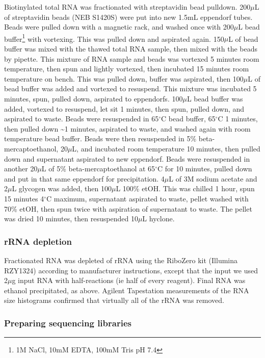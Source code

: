 Biotinylated total RNA was fractionated with streptavidin bead pulldown.
200\(\mu\)L of streptavidin beads (NEB S1420S) were put into new 1.5mL
eppendorf tubes. Beads were pulled down with a magnetic rack, and washed
once with 200\(\mu\)L bead buffer\footnote{1M NaCl, 10mM EDTA, 100mM
  Tris pH 7.4} with vortexing. This was pulled down and aspirated again.
150\(\mu\)L of bead buffer was mixed with the thawed total RNA sample,
then mixed with the beads by pipette. This mixture of RNA sample and
beads was vortexed 5 minutes room temperature, then spun and lightly
vortexed, then incubated 15 minutes room temperature on bench. This was
pulled down, buffer was aspirated, then 100\(\mu\)L of bead buffer was
added and vortexed to resuspend. This mixture was incubated 5 minutes,
spun, pulled down, aspirated to eppendorfs. 100\(\mu\)L bead buffer was
added, vortexed to resuspend, let sit 1 minutes, then spun, pulled down,
and aspirated to waste. Beads were resuspended in 65\(^{\circ}\)C bead
buffer, 65\(^{\circ}\)C 1 minutes, then pulled down \textasciitilde{}1
minutes, aspirated to waste, and washed again with room temperature bead
buffer. Beads were then resuspended in 5\% beta-mercaptoethanol,
20\(\mu\)L, and incubated room temperature 10 minutes, then pulled down
and supernatant aspirated to new eppendorf. Beads were resuspended in
another 20\(\mu\)L of 5\% beta-mercaptoethanol at 65\(^{\circ}\)C for 10
minutes, pulled down and put in that same eppendorf for precipitation.
4\(\mu\)L of 3M sodium acetate and 2\(\mu\)L glycogen was added, then
100\(\mu\)L 100\% etOH. This was chilled 1 hour, spun 15 minutes
4\(^{\circ}\)C maximum, supernatant aspirated to waste, pellet washed
with 70\% etOH, then spun twice with aspiration of supernatant to waste.
The pellet was dried 10 minutes, then resuspended 10\(\mu\)L hyclone.

\subsubsection{rRNA depletion}

Fractionated RNA was depleted of rRNA using the RiboZero kit (Illumina
RZY1324) according to manufacturer instructions, except that the input
we used 2\(\mu\)g input RNA with half-reactions (ie half of every
reagent). Final RNA was ethanol precipitated, as above. Agilent
Tapestation measurements of the RNA size histograms confirmed that
virtually all of the rRNA was removed.

\subsubsection{Preparing sequencing libraries}

